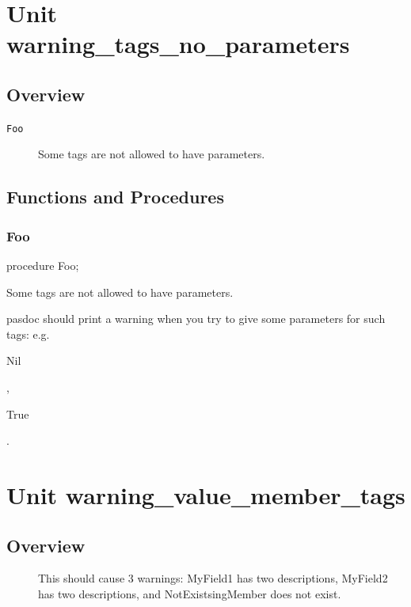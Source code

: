 \documentclass{report}
\begin{document}
\chapter{Unit warning{\_}tags{\_}no{\_}parameters}
\section{Overview}
\begin{description}
\item[\texttt{Foo}]Some tags are not allowed to have parameters.
\end{description}
\section{Functions and Procedures}
\subsection*{Foo}
\begin{list}{}{
\setlength{\itemindent}{0cm}
\setlength{\listparindent}{0cm}
\setlength{\leftmargin}{\evensidemargin}
\addtolength{\leftmargin}{\tmplength}
\settowidth{\labelsep}{X}
\addtolength{\leftmargin}{\labelsep}
\setlength{\labelwidth}{\tmplength}
}
\begin{flushleft}
\item[\textbf{Declaration}\hfill]
\begin{ttfamily}
procedure Foo;\end{ttfamily}


\end{flushleft}
\par
\item[\textbf{Description}]
Some tags are not allowed to have parameters.

pasdoc should print a warning when you try to give some parameters for such tags: e.g. \begin{ttfamily}Nil\end{ttfamily}, \begin{ttfamily}True\end{ttfamily}.

\end{list}
\chapter{Unit warning{\_}value{\_}member{\_}tags}
\section{Overview}
\begin{description}
\item[\texttt{\begin{ttfamily}TMyClass\end{ttfamily} Class}]

 



This should cause 3 warnings: MyField1 has two descriptions, MyField2 has two descriptions, and NotExistsingMember does not exist.
\end{description}
\end{document}
